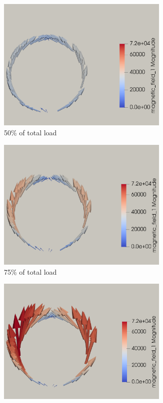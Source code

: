 \documentclass[11pt,a4paper,final]{article}
\begin{document}
\begin{figure}[h]
\centering
\begin{subfigure}{0.32\textwidth}
\centering
\includegraphics[width=0.9\textwidth]{coup_mag_field_membrane_ls_50.png}
\caption{50\% of total load}
\label{fig:3.14.1}
\end{subfigure}
\begin{subfigure}{0.32\textwidth}
\centering
\includegraphics[width=0.9\textwidth]{coup_mag_field_membrane_ls_75.png}
\caption{75\% of total load}
\label{fig:3.14.2}
\end{subfigure}
\begin{subfigure}{0.32\textwidth}
\centering
\includegraphics[width=0.9\textwidth]{coup_mag_field_membrane_ls_100.png}

\end{subfigure}
\end{figure}
\end{document}
